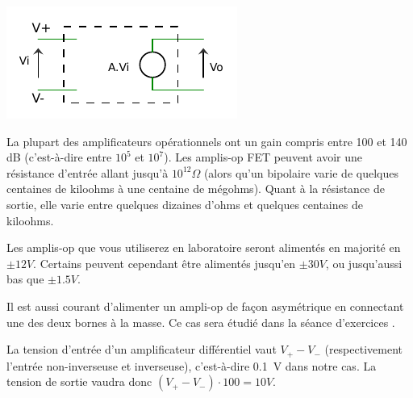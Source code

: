 \documentclass{../template/tp}
\begin{document}
{
	\begin{center}
		\includegraphics[scale=1.4]{schema-ampli-op.pdf}
	\end{center}
}

{
	La plupart des amplificateurs opérationnels ont un gain compris entre 100 et 140 dB (c'est-à-dire entre $10^5$ et $10^7$).
	Les amplis-op FET peuvent avoir une résistance d'entrée allant jusqu'à $10^{12}\Omega$ (alors qu'un bipolaire varie de quelques centaines de kiloohms à une centaine de mégohms).
	Quant à la résistance de sortie, elle varie entre quelques dizaines d'ohms et quelques centaines de kiloohms.
}

{
	Les amplis-op que vous utiliserez en laboratoire seront alimentés en majorité en $\pm 12 V$.
	Certains peuvent cependant être alimentés jusqu'en $\pm 30 V$, ou jusqu'aussi bas que $\pm 1.5 V$.

	Il est aussi courant d'alimenter un ampli-op de façon asymétrique en connectant une des deux bornes à la masse.
	Ce cas sera étudié dans la séance d'exercices .
}

{
	La tension d'entrée d'un amplificateur différentiel vaut $V_+ - V_-$ (respectivement l'entrée non-inverseuse et inverseuse), c'est-à-dire 0.1~V dans notre cas.
	La tension de sortie vaudra donc $(V_+ - V_-) \cdot 100 = 10 V$.
}
\end{document}

